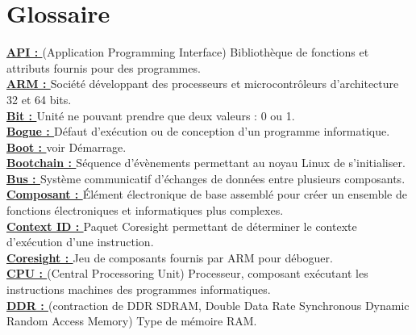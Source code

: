 
\chapter*{Glossaire}

\newcommand{\bu}[1]{\textbf{\underline{#1}}}

\noindent
\bu{API : } (Application Programming Interface) Bibliothèque de fonctions et
attributs fournis pour des programmes. \\

\noindent
\bu{ARM : } Société développant des processeurs et microcontrôleurs
d'architecture 32 et 64 bits. \\

\noindent
\bu{Bit : } Unité ne pouvant prendre que deux valeurs : 0 ou 1. \\

\noindent
\bu{Bogue : } Défaut d'exécution ou de conception d'un programme informatique.
\\

\noindent
\bu{Boot : } voir Démarrage. \\

\noindent
\bu{Bootchain : } Séquence d'évènements permettant au noyau Linux de
s'initialiser. \\

\noindent
\bu{Bus : } Système communicatif d'échanges de données entre plusieurs
composants. \\

\noindent
\bu{Composant : } Élément électronique de base assemblé pour créer un ensemble
de fonctions électroniques et informatiques plus complexes. \\

\noindent
\bu{Context ID : } Paquet Coresight permettant de déterminer le contexte
d'exécution d'une instruction. \\

\noindent
\bu{Coresight : } Jeu de composants fournis par ARM pour déboguer. \\

\noindent
\bu{CPU : } (Central Processoring Unit) Processeur, composant exécutant les
instructions machines des programmes informatiques. \\

\noindent
\bu{DDR : } (contraction de DDR SDRAM, Double Data Rate Synchronous Dynamic
Random Access Memory) Type de mémoire RAM. \\

